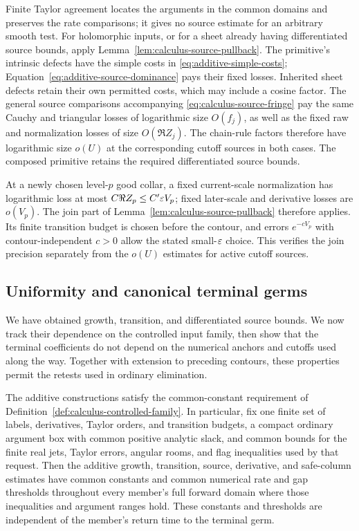Finite Taylor agreement locates the arguments in the common domains and
preserves the rate comparisons; it gives no source estimate for an
arbitrary smooth test.  For holomorphic inputs, or for a sheet already
having differentiated source bounds, apply
Lemma~\ref{lem:calculus-source-pullback}.  The primitive's intrinsic
defects have the simple costs in \eqref{eq:additive-simple-costs};
Equation~\eqref{eq:additive-source-dominance} pays their fixed losses.
Inherited sheet defects retain their own permitted costs, which may
include a cosine factor.  The general source comparisons accompanying
\eqref{eq:calculus-source-fringe} pay the same Cauchy and triangular
losses of logarithmic size $O(f_j)$, as well as the fixed raw and
normalization losses of size $O(\Re Z_j)$.  The chain-rule factors
therefore have logarithmic size $o(U)$ at the corresponding cutoff
sources in both cases.  The composed primitive retains the required
differentiated source bounds.

At a newly chosen level-$p$ good collar, a fixed current-scale
normalization has logarithmic loss at most
$C\Re Z_p\le C'\varepsilon V_p$; fixed later-scale and derivative losses are
$o(V_p)$.  The join part of Lemma~\ref{lem:calculus-source-pullback}
therefore applies.  Its finite transition budget is chosen before the
contour, and errors $e^{-cV_p}$ with contour-independent $c>0$ allow the
stated small-$\varepsilon$ choice.  This verifies the join precision separately
from the $o(U)$ estimates for active cutoff sources.

\subsection{Uniformity and canonical terminal germs}

We have obtained growth, transition, and differentiated source bounds.
We now track their dependence on the controlled input family, then show
that the terminal coefficients do not depend on the numerical anchors
and cutoffs used along the way.  Together with extension to preceding
contours, these properties permit the retests used in ordinary elimination.

\begin{lemma}
\label{lem:additive-controlled-family}
The additive constructions satisfy the common-constant requirement of
Definition~\ref{def:calculus-controlled-family}.  In particular, fix
one finite set of labels, derivatives, Taylor orders, and transition
budgets, a compact ordinary argument box with common positive analytic
slack, and common bounds for the finite real jets, Taylor errors,
angular rooms, and flag inequalities used by that request.  Then the
additive growth, transition, source, derivative, and safe-column
estimates have common constants and common numerical rate and gap
thresholds throughout every member's full forward domain where those
inequalities and argument ranges hold.  These constants and thresholds
are independent of the member's return time to the terminal germ.
\end{lemma}

